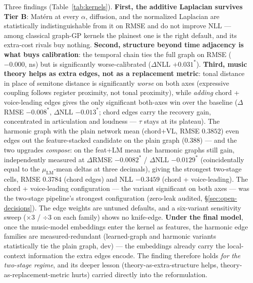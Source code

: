 \documentclass[11pt,a4paper]{report}
\newcommand{\rmseStack}{0.388}         %
\newcommand{\muLM}{\mu_{\mathrm{LM}}}  %
\begin{document}
Three findings (Table~\ref{tab:kernels}). \textbf{First, the additive Laplacian
survives Tier B}: Mat\'ern at every $\alpha$, diffusion, and the normalized Laplacian
are statistically indistinguishable from it on RMSE and do not improve NLL --- among
classical graph-GP kernels the plainest one is the right default, and its extra-cost
rivals buy nothing. \textbf{Second, structure beyond time adjacency is what buys
calibration}: the temporal chain ties the full graph on RMSE ($-0.000$, ns) but is
significantly worse-calibrated ($\Delta$NLL $+0.031^{*}$). \textbf{Third, music theory
helps as extra edges, not as a replacement metric}: tonal distance in place of semitone
distance is significantly \emph{worse} on both axes (expressive coupling follows
register proximity, not tonal proximity), while \emph{adding} chord + voice-leading
edges gives the only significant both-axes win over the baseline
($\Delta$RMSE $-0.008^{*}$, $\Delta$NLL $-0.013^{*}$; chord edges carry the recovery
gain, concentrated in articulation and loudness --- $\tau$ stays at its
plateau). The harmonic graph with the plain network mean (chord+VL, RMSE $0.3852$)
even edges out
the feature-stacked candidate on the plain graph (\rmseStack) --- and the two upgrades
\emph{compose}: on the feat+LM mean the harmonic graphs still gain, independently
measured at $\Delta$RMSE $-0.0082^{*}$ / $\Delta$NLL $-0.0129^{*}$
(coincidentally equal to the $\muLM$-mean deltas at three decimals), giving the
strongest two-stage cells, RMSE $0.3784$ (chord edges) and NLL $-0.3459$
(chord + voice-leading).
The chord + voice-leading configuration --- the variant significant on both axes ---
was the two-stage pipeline's strongest configuration (zero-leak audited,
\S\ref{sec:open-decisions}). The edge weights are untuned defaults, and a
six-variant sensitivity sweep ($\times 3$ / $\div 3$ on each family) shows no
knife-edge. \textbf{Under the final model}, once the music-model
embeddings enter the kernel as features, the harmonic edge families are
measured-redundant (learned-graph and harmonic variants statistically tie the
plain graph, dev) --- the embeddings already carry the local-context information
the extra edges encode. The finding therefore holds \emph{for the two-stage
regime}, and its deeper lesson (theory-as-extra-structure helps,
theory-as-replacement-metric hurts) carried directly into the reformulation.
\end{document}
